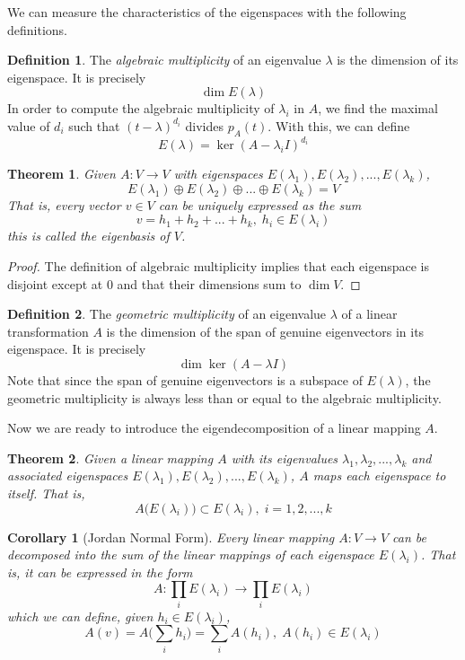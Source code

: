 \documentclass{article}
\newtheorem{theorem}{Theorem}[section]
\newtheorem{corollary}{Corollary}[theorem]
\theoremstyle{remark}
\theoremstyle{definition}
\newtheorem{definition}{Definition}[section]
\begin{document}
    We can measure the characteristics of the eigenspaces with the following definitions. 

    \begin{definition}
    The \textit{algebraic multiplicity} of an eigenvalue $\lambda$ is the dimension of its eigenspace. It is precisely
    \[\dim{E(\lambda)}\]  
    In order to compute the algebraic multiplicity of $\lambda_i$ in $A$, we find the maximal value of $d_i$ such that $(t-\lambda)^{d_i}$ divides $p_A (t)$. With this, we can define 
    \[E(\lambda) = \ker{(A - \lambda_i I)^{d_i}}\]
    \end{definition} 

    \begin{theorem}
    Given $A: V \longrightarrow V$ with eigenspaces $E(\lambda_1), E(\lambda_2), ..., E(\lambda_k)$, 
    \[E(\lambda_1) \oplus E(\lambda_2) \oplus ... \oplus E(\lambda_k) = V\]
    That is, every vector $v \in V$ can be uniquely expressed as the sum 
    \[ v = h_1 + h_2 + ... + h_k, \; h_i \in E(\lambda_i)\]
    this is called the \textit{eigenbasis of $V$}. 
    \end{theorem}
    \begin{proof}
    The definition of algebraic multiplicity implies that each eigenspace is disjoint except at $0$ and that their dimensions sum to $\dim{V}$. 
    \end{proof}

    \begin{definition}
    The \textit{geometric multiplicity} of an eigenvalue $\lambda$ of a linear transformation $A$ is the dimension of the span of genuine eigenvectors in its eigenspace. It is precisely 
    \[\dim{\ker{(A - \lambda I)}}\]
    Note that since the span of genuine eigenvectors is a subspace of $E(\lambda)$, the geometric multiplicity is always less than or equal to the algebraic multiplicity. 
    \end{definition}

    Now we are ready to introduce the eigendecomposition of a linear mapping $A$.

    \begin{theorem}
    Given a linear mapping $A$ with its eigenvalues $\lambda_1, \lambda_2, ..., \lambda_k$ and associated eigenspaces $E(\lambda_1), E(\lambda_2), ..., E(\lambda_k)$, $A$ maps each eigenspace to itself. That is, 
    \[A\big( E(\lambda_i) \big) \subset E(\lambda_i), \; i = 1, 2, ..., k\]
    \end{theorem}

    \begin{corollary}[Jordan Normal Form]
    Every linear mapping $A: V \longrightarrow V$ can be decomposed into the sum of the linear mappings of each eigenspace $E(\lambda_i)$. That is, it can be expressed in the form 
    \[A: \prod_i E(\lambda_i) \longrightarrow \prod_i E(\lambda_i)\]
    which we can define, given $h_i \in E(\lambda_i)$, 
    \[A(v) = A\bigg(\sum_i h_i \bigg) = \sum_i A(h_i), \; A(h_i) \in E(\lambda_i) \]
    \end{corollary}
\end{document}
